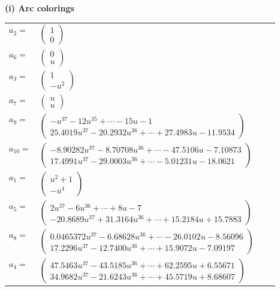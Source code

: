 \documentclass[1p]{elsarticle_modified}
\theoremstyle{definition}
\begin{document}
\flushleft \textbf{(i) Arc colorings}\\
\begin{tabular}{m{7pt} m{180pt} m{7pt} m{180pt} }
\flushright $a_{2}=$&$\begin{pmatrix}1\\0\end{pmatrix}$ \\
\flushright $a_{6}=$&$\begin{pmatrix}0\\u\end{pmatrix}$ \\
\flushright $a_{3}=$&$\begin{pmatrix}1\\- u^2\end{pmatrix}$ \\
\flushright $a_{7}=$&$\begin{pmatrix}u\\u\end{pmatrix}$ \\
\flushright $a_{9}=$&$\begin{pmatrix}- u^{37}-12 u^{35}+\cdots-15 u-1\\25.4019 u^{37}-20.2932 u^{36}+\cdots+27.4983 u-11.9534\end{pmatrix}$ \\
\flushright $a_{10}=$&$\begin{pmatrix}-8.90282 u^{37}-8.70708 u^{36}+\cdots-47.5106 u-7.10873\\17.4991 u^{37}-29.0003 u^{36}+\cdots-5.01231 u-18.0621\end{pmatrix}$ \\
\flushright $a_{1}=$&$\begin{pmatrix}u^2+1\\- u^4\end{pmatrix}$ \\
\flushright $a_{5}=$&$\begin{pmatrix}2 u^{37}-6 u^{36}+\cdots+8 u-7\\-20.8689 u^{37}+31.3164 u^{36}+\cdots+15.2184 u+15.7883\end{pmatrix}$ \\
\flushright $a_{8}=$&$\begin{pmatrix}0.0465372 u^{37}-6.68628 u^{36}+\cdots-26.0102 u-8.56096\\17.2296 u^{37}-12.7400 u^{36}+\cdots+15.9072 u-7.09197\end{pmatrix}$ \\
\flushright $a_{4}=$&$\begin{pmatrix}47.5463 u^{37}-43.5185 u^{36}+\cdots+62.2595 u+6.55671\\34.9682 u^{37}-21.6243 u^{36}+\cdots+45.5719 u+8.68607\end{pmatrix}$ \\

\end{tabular}
\end{document}
